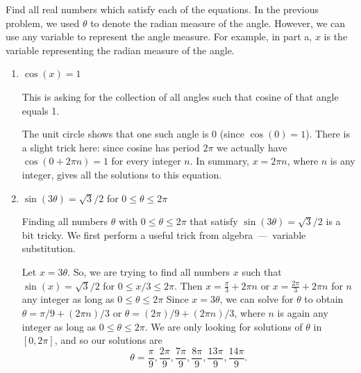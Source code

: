\documentclass[nooutcomes]{ximera}
\begin{document}
\begin{problem}

  Find all real numbers which satisfy each of the equations.  In the previous problem, we used $\theta$ to denote the radian measure of the angle.  However, we can use any variable to represent the angle measure.  For example, in part a, $x$ is the variable representing the radian measure of the angle.
  \begin{enumerate}
    \item
      $\cos(x) = 1$
      \begin{freeResponse}
        This is asking for the collection of all angles such that cosine of that angle equals 1.

        The unit circle shows that one such angle is $0$ (since $\cos(0) = 1$).
        There is a slight trick here: since cosine has period $2\pi$ we actually have $\cos(0 + 2\pi n) = 1$ for every integer $n$.
        In summary, $x = 2\pi n$, where $n$ is any integer, gives all the solutions to this equation.
      \end{freeResponse}

    \item
      $\sin(3 \theta) = \sqrt{3}/2$ for $0 \leq \theta \leq 2\pi$
      \begin{freeResponse}
        Finding all numbers $\theta$ with $0 \leq \theta \leq 2\pi$ that satisfy $\sin(3 \theta) = \sqrt{3}/2$ is a bit tricky.
        We first perform a useful trick from algebra~---~variable substitution.

        Let $x = 3\theta$.
        So, we are trying to find all numbers $x$ such that $\sin(x) = \sqrt{3}/2$ for $0 \leq x/3 \leq 2\pi$.
        Then $ x= \frac{\pi}{3} + 2 \pi n$ or $ x = \frac{2 \pi }{3} + 2 \pi n $ for $n$ any integer as long as $0 \leq \theta \leq 2\pi$
        Since $x = 3 \theta$, we can solve for $\theta$ to obtain $\theta = \pi/9 + (2 \pi n)/3$ or $\theta = (2\pi)/9 + (2\pi n)/3$, where $n$ is again any integer as long as $0 \leq \theta \leq 2\pi$.
        We are only looking for solutions of $\theta$ in $[0, 2\pi ]$, and so our solutions are
        \[
        \theta = \frac{\pi}{9}, \frac{2\pi}{9}, \frac{7\pi}{9}, \frac{8\pi}{9}, \frac{13\pi}{9}, \frac{14\pi}{9}. 
        \]
      \end{freeResponse}
  \end{enumerate}
\end{problem}
\end{document}
